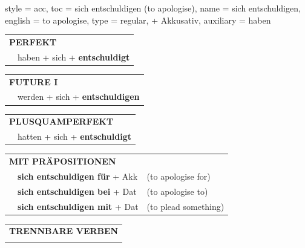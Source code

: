 \begin{verbentry}{
  style = {acc},
  toc = {sich entschuldigen (to apologise)},
  name = {sich entschuldigen},
  english = {to apologise},
  type = {regular, + Akkusativ},
  auxiliary = {haben}
}
    \vspace{10pt}

 \begin{tabular}{rl}
     \multicolumn{2}{l}{\textbf{PERFEKT}}\\
    &haben + sich + \textbf{entschuldigt}\\
  \end{tabular}
\hfill
   \begin{tabular}{rl}
   
    \multicolumn{2}{l}{\textbf{FUTURE I} }\\
    &werden + sich + \textbf{entschuldigen}\\
 
  \end{tabular}
\hfill
   \begin{tabular}{rl}
      \multicolumn{2}{l}{\textbf{PLUSQUAMPERFEKT}}\\
    &hatten + sich + \textbf{entschuldigt}\\
  \end{tabular}
  
\vspace{10pt}

   \begin{tabular}{lll}
      \multicolumn{3}{l}{\textbf{MIT PRÄPOSITIONEN}}\\
& \textbf{sich entschuldigen für} + Akk & (to apologise for)\\
& \textbf{sich entschuldigen bei} + Dat & (to apologise to)\\
& \textbf{sich entschuldigen mit} + Dat & (to plead something)
  \end{tabular}
  \hfill
   \begin{tabular}{lll}
      \multicolumn{3}{l}{\textbf{TRENNBARE VERBEN}}\\
\vspace{30pt}
 \end{tabular}
  
  \vspace{-5pt}
\end{verbentry}

